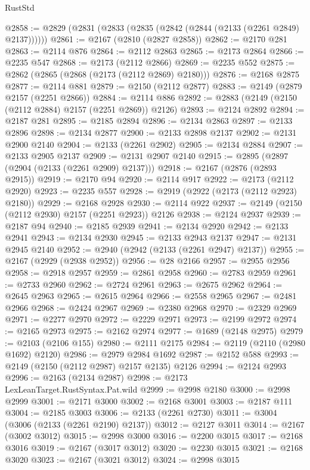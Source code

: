 \begin{lexlean}{RustStd}
\begin{coremodule}
{\begin{coremodule}
{{{{{{{{{{{{{{{{@2858 := @2829 (@2831 (@2833 (@2835 (@2842 (@2844 (@2133 (@2261 @2849) @2137))))))
@2861 := @2167 (@2810 (@2827 @2858))
@2862 := @2170 @281
@2863 := @2114 @876
@2864 := @2112 @2863
@2865 := @2173 @2864
@2866 := @2235 @547
@2868 := @2173 (@2112 @2866)
@2869 := @2235 @552
@2875 := @2862 (@2865 (@2868 (@2173 (@2112 @2869) @2180)))
@2876 := @2168 @2875
@2877 := @2114 @881
@2879 := @2150 (@2112 @2877)
@2883 := @2149 (@2879 @2157 (@2251 @2866))
@2884 := @2114 @886
@2892 := @2883 (@2149 (@2150 (@2112 @2884) @2157 (@2251 @2869)) @2126)
@2893 := @2124 @2892
@2894 := @2187 @281
@2895 := @2185 @2894
@2896 := @2134 @2863
@2897 := @2133 @2896
@2898 := @2134 @2877
@2900 := @2133 @2898 @2137
@2902 := @2131 @2900 @2140
@2904 := @2133 (@2261 @2902)
@2905 := @2134 @2884
@2907 := @2133 @2905 @2137
@2909 := @2131 @2907 @2140
@2915 := @2895 (@2897 (@2904 (@2133 (@2261 @2909) @2137)))
@2918 := @2167 (@2876 (@2893 @2915))
@2919 := @2170 @94
@2920 := @2114 @917
@2922 := @2173 (@2112 @2920)
@2923 := @2235 @557
@2928 := @2919 (@2922 (@2173 (@2112 @2923) @2180))
@2929 := @2168 @2928
@2930 := @2114 @922
@2937 := @2149 (@2150 (@2112 @2930) @2157 (@2251 @2923)) @2126
@2938 := @2124 @2937
@2939 := @2187 @94
@2940 := @2185 @2939
@2941 := @2134 @2920
@2942 := @2133 @2941
@2943 := @2134 @2930
@2945 := @2133 @2943 @2137
@2947 := @2131 @2945 @2140
@2952 := @2940 (@2942 (@2133 (@2261 @2947) @2137))
@2955 := @2167 (@2929 (@2938 @2952))
@2956 := @28 @2166
@2957 := @2955 @2956
@2958 := @2918 @2957
@2959 := @2861 @2958
@2960 := @2783 @2959
@2961 := @2733 @2960
@2962 := @2724 @2961
@2963 := @2675 @2962
@2964 := @2645 @2963
@2965 := @2615 @2964
@2966 := @2558 @2965
@2967 := @2481 @2966
@2968 := @2424 @2967
@2969 := @2380 @2968
@2970 := @2329 @2969
@2971 := @2277 @2970
@2972 := @2229 @2971
@2973 := @2199 @2972
@2974 := @2165 @2973
@2975 := @2162 @2974
@2977 := @1689 (@2148 @2975)
@2979 := @2103 (@2106 @155)
@2980 := @2111 @2175
@2984 := @2119 (@2110 (@2980 @1692) @2120)
@2986 := @2979 @2984 @1692
@2987 := @2152 @588
@2993 := @2149 (@2150 (@2112 @2987) @2157 @2135) @2126
@2994 := @2124 @2993
@2996 := @2163 (@2134 @2987)
@2998 := @2173 LexLeanTarget.RustSyntax.Pat.wild
@2999 := @2998 @2180
@3000 := @2998 @2999
@3001 := @2171 @3000
@3002 := @2168 @3001
@3003 := @2187 @111
@3004 := @2185 @3003
@3006 := @2133 (@2261 @2730)
@3011 := @3004 (@3006 (@2133 (@2261 @2190) @2137))
@3012 := @2127 @3011
@3014 := @2167 (@3002 @3012)
@3015 := @2998 @3000
@3016 := @2200 @3015
@3017 := @2168 @3016
@3019 := @2167 (@3017 @3012)
@3020 := @2230 @3015
@3021 := @2168 @3020
@3023 := @2167 (@3021 @3012)
@3024 := @2998 @3015
}}}}}}}}}}}}}}}}
\end{coremodule}}
\end{coremodule}
\end{lexlean}
